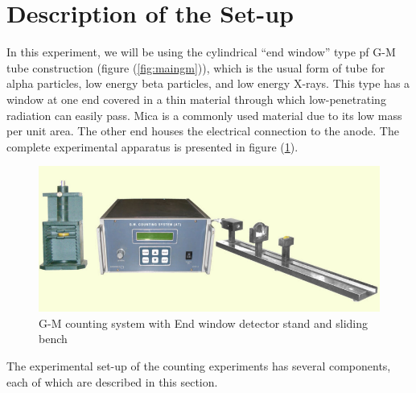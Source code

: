\documentclass[%
 reprint,
nofootinbib,
 amsmath,amssymb,
 aps,
floatfix,
]{revtex4-2}
\begin{document}
\section{Description of the Set-up}
    In this experiment, we will be using the cylindrical ``end window'' type pf G-M tube construction (figure (\ref{fig:maingm})), which is the usual form of tube for alpha particles, low energy beta particles, and low energy X-rays. This type has a window at one end covered in a thin material through which low-penetrating radiation can easily pass. Mica is a commonly used material due to its low mass per unit area. The other end houses the electrical connection to the anode. The complete experimental apparatus is presented in figure (\ref{fig:expt-setup}).
    \begin{figure}
        \centering
        \includegraphics[scale = 0.45]{Figures/gmcounting.png}
        \caption{G-M counting system with End window detector stand and sliding bench}
        \label{fig:expt-setup}
    \end{figure}
    The experimental set-up of the counting experiments has several components, each of which are described in this section.
\end{document}
